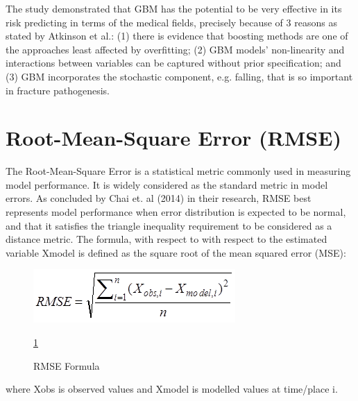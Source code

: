 \documentclass[10pt,11pt,12pt,oneside]{book}
\begin{document}
        The study demonstrated that GBM has the potential to be very effective in its risk predicting in terms of the medical fields, precisely because of 3 reasons as stated by Atkinson et al.: (1) there is evidence that boosting methods are one of the approaches least affected by overfitting; (2) GBM models’ non-linearity and interactions between variables can be captured without prior specification; and (3) GBM incorporates the stochastic component, e.g. falling, that is so important in fracture pathogenesis. \cite{Atkinson2012}
    \section{Root-Mean-Square Error (RMSE)}
    The Root-Mean-Square Error is a statistical metric commonly used in measuring model performance. It is widely considered as the standard metric in model errors. As concluded by Chai et. al (2014) in their research, RMSE best represents model performance when error distribution is expected to be normal, and that it satisfies the triangle inequality requirement to be considered as a distance metric. The formula, with respect to with respect to the estimated variable Xmodel is defined as the square root of the mean squared error (MSE): 
                           \begin{figure}
         \includegraphics[width=\linewidth]{rmseformula.png}
         \caption{RMSE Formula}
         \label{fig:formula}
         
             \ref{fig:formula}
\end{figure}

    where Xobs is observed values and Xmodel is modelled values at time/place i.

   \pagebreak
\end{document}

